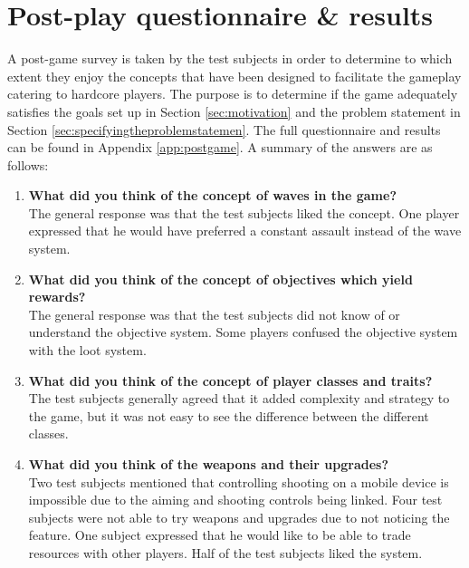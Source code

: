\section{Post-play questionnaire \& results}\label{test:results}
A post-game survey is taken by the test subjects in order to determine to which extent they enjoy the concepts that have been designed to facilitate the gameplay catering to hardcore players.
The purpose is to determine if the game adequately satisfies the goals set up in Section \ref{sec:motivation} and the problem statement in Section \ref{sec:specifyingtheproblemstatemen}.
The full questionnaire and results can be found in Appendix \ref{app:postgame}.
A summary of the answers are as follows:
\begin{enumerate}\label{test:post-play}
\item \textbf{What did you think of the concept of waves in the game?}\vspace{4pt}\\
The general response was that the test subjects liked the concept.
One player expressed that he would have preferred a constant assault instead of the wave system.

\item \textbf{What did you think of the concept of objectives which yield rewards?}\vspace{4pt}\\
The general response was that the test subjects did not know of or understand the objective system.
Some players confused the objective system with the loot system.

\item \textbf{What did you think of the concept of player classes and traits?}\vspace{4pt}\\
The test subjects generally agreed that it added complexity and strategy to the game, but it was not easy to see the difference between the different classes.

\item \textbf{What did you think of the weapons and their upgrades?}\vspace{4pt}\\
Two test subjects mentioned that controlling shooting on a mobile device is impossible due to the aiming and shooting controls being linked.
Four test subjects were not able to try weapons and upgrades due to not noticing the feature.
One subject expressed that he would like to be able to trade resources with other players.
Half of the test subjects liked the system.


\end{enumerate}
